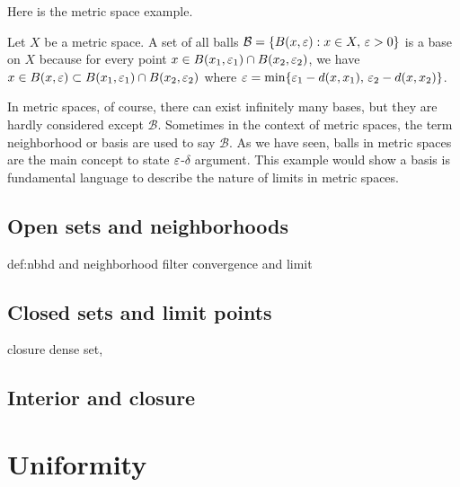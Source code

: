 \documentclass{../crs}
\begin{document}
Here is the metric space example.
\begin{ex}
Let $X$ be a metric space.
A set of all balls $\mathcal{B}=\{B(x,\varepsilon):x\in X,\,\varepsilon>0\}$ is a base on $X$ because for every point $x\in B(x_1,\varepsilon_1)\cap B(x_2,\varepsilon_2)$, we have $x\in B(x,\varepsilon)\subset B(x_1,\varepsilon_1)\cap B(x_2,\varepsilon_2)$ where $\varepsilon=\min\{\varepsilon_1-d(x,x_1),\,\varepsilon_2-d(x,x_2)\}$.
\end{ex}

In metric spaces, of course, there can exist infinitely many bases, but they are hardly considered except $\mathcal{B}$.
Sometimes in the context of metric spaces, the term neighborhood or basis are used to say $\mathcal{B}$.
As we have seen, balls in metric spaces are the main concept to state $\varepsilon$-$\delta$ argument.
This example would show a basis is fundamental language to describe the nature of limits in metric spaces.










\subsection{Open sets and neighborhoods}
def:nbhd and neighborhood filter
convergence and limit

\subsection{Closed sets and limit points}
 closure
 dense set,
\subsection{Interior and closure}




























\section{Uniformity}
\end{document}
